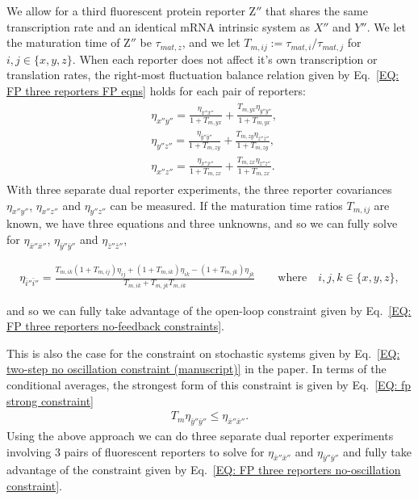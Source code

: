 \documentclass[%
 reprint,prx,
superscriptaddress,
%
%
%
%
%
%
%
%
%
 amsmath,amssymb,
 aps,
%
%
%
%
%
%
]{revtex4-2}
\begin{document}
{{We allow for a third fluorescent protein reporter Z$''$ that shares the same transcription rate and an identical mRNA intrinsic system as $X''$ and $Y''$. We let the maturation time of Z$''$ be $\tau_{mat,z}$, and we let $T_{m,ij} := \tau_{mat,i}/\tau_{mat,j}$ for $i,j \in \{x,y,z\}$. When each reporter does not affect it's own transcription or translation rates, the right-most fluctuation balance relation given by Eq.~\eqref{EQ: FP three reporters FP eqns} holds for each pair of reporters: 
\begin{align}
\begin{split}
   &\eta_{x''y''} =  \frac{\eta_{\bar{x}''\bar{x}''}}{1+T_{m,yx}} + \frac{T_{m,yx}\eta_{\bar{y}''\bar{y}''}}{1+T_{m,yx}}, \\
   &\eta_{y''z''} =  \frac{\eta_{\bar{y}''\bar{y}''}}{1+T_{m,zy}} + \frac{T_{m,zy}\eta_{\bar{z}''\bar{z}''}}{1+T_{m,zy}}, \\
   &\eta_{x''z''} =  \frac{\eta_{\bar{x}''\bar{x}''}}{1+T_{m,zx}} + \frac{T_{m,zx}\eta_{\bar{z}''\bar{z}''}}{1+T_{m,zx}} .
   \end{split}
\end{align}
With three separate dual reporter experiments, the three reporter covariances $\eta_{x''y''}$, $\eta_{x''z''}$ and $\eta_{y''z''}$ can be measured. If the maturation time ratios $T_{m,ij}$ are known, we have three equations and three unknowns, and so we can fully solve for $\eta_{\bar{x}''\bar{x}''}$, $\eta_{\bar{y}''\bar{y}''}$ and $\eta_{\bar{z}''\bar{z}''}$, 
\begin{widetext}
\begin{align}
    \eta_{\bar{i}''\bar{i}''} = \frac{T_{m,ik}(1 + T_{m,ij})\eta_{ij} + (1+T_{m,ik})\eta_{ik} - (1+T_{m,jk})\eta_{jk}}{T_{m,ik} + T_{m,jk}T_{m,ik}} \quad\quad \text{where} \quad i,j,k \in \{x,y,z\} ,
\end{align}
\end{widetext} 
and so we can fully take advantage of the open-loop constraint given by Eq.~\eqref{EQ: FP three reporters no-feedback constraints}.

This is also the case for the constraint on stochastic systems given by Eq.~\eqref{EQ: two-step no oscillation constraint (manuscript)} in the paper. In terms of the conditional averages, the strongest form of this constraint is given by Eq.~\eqref{EQ: fp strong constraint}
\begin{align}
    T_{m}\eta_{\bar{y}''\bar{y}''} \leq \eta_{\bar{x}''\bar{x}''} .
    \label{EQ: FP three reporters no-oscillation constraint}
\end{align}
Using the above approach we can do three separate dual reporter experiments involving 3 pairs of fluorescent reporters to solve for $\eta_{\bar{x}''\bar{x}''}$ and $\eta_{\bar{y}''\bar{y}''}$ and fully take advantage of the constraint given by Eq.~\eqref{EQ: FP three reporters no-oscillation constraint}. 


}}
\end{document}
